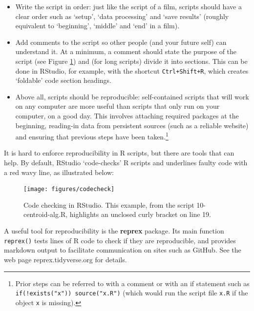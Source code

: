 \documentclass[]{krantz}
\providecommand{\tightlist}{%
  \setlength{\itemsep}{0pt}\setlength{\parskip}{0pt}}
\let\rmarkdownfootnote\footnote%
\def\footnote{\protect\rmarkdownfootnote}
\let\BeginKnitrBlock\begin \let\EndKnitrBlock\end
\begin{document}
\begin{itemize}
\tightlist
\item
  Write the script in order: just like the script of a film, scripts should have a clear order such as `setup', `data processing' and `save results' (roughly equivalent to `beginning', `middle' and `end' in a film).
\item
  Add comments to the script so other people (and your future self) can understand it. At a minimum, a comment should state the purpose of the script (see Figure \ref{fig:codecheck}) and (for long scripts) divide it into sections. This can be done in RStudio, for example, with the shortcut \texttt{Ctrl+Shift+R}, which creates `foldable' code section headings.
\item
  Above all, scripts should be reproducible: self-contained scripts that will work on any computer are more useful than scripts that only run on your computer, on a good day. This involves attaching required packages at the beginning, reading-in data from persistent sources (such as a reliable website) and ensuring that previous steps have been taken.\footnote{Prior steps can be referred to with a comment or with an if statement such as \texttt{if(!exists("x"))\ source("x.R")} (which would run the script file \texttt{x.R} if the object \texttt{x} is missing).}
\end{itemize}

It is hard to enforce reproducibility in R scripts, but there are tools that can help.
By default, RStudio `code-checks' R scripts and underlines faulty code with a red wavy line, as illustrated below:

\begin{figure}[t]

{\centering \texttt{[image: figures/codecheck]} 

}

\caption[Illustration of 'code checking' in RStudio.]{Code checking in RStudio. This example, from the script 10-centroid-alg.R, highlights an unclosed curly bracket on line 19.}\label{fig:codecheck}
\end{figure}

\BeginKnitrBlock{rmdnote}
A useful tool for reproducibility is the \textbf{reprex} package.
Its main function \texttt{reprex()} tests lines of R code to check if they are reproducible, and provides markdown output to facilitate communication on sites such as GitHub.
See the web page reprex.tidyverse.org for details.
\EndKnitrBlock{rmdnote}
\end{document}
